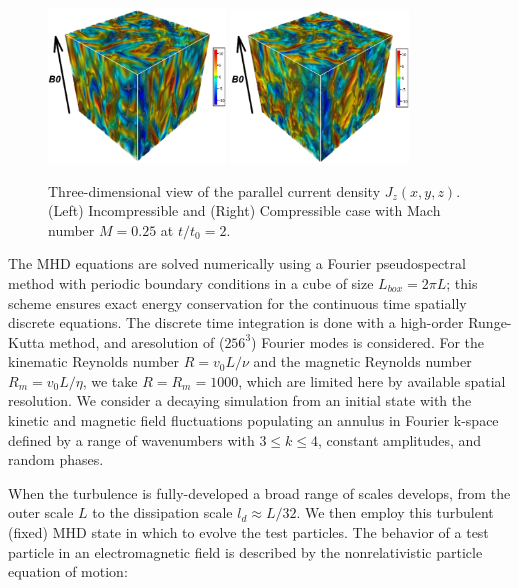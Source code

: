 \documentclass[%
aip,pop,amsmath,amssymb,
 reprint,%
]{revtex4-1}
\begin{document}
\begin{figure}[<t>]
\begin{center}
{\includegraphics[width = 0.42\textwidth]{./Figures/Fig1_a}}
{\includegraphics[width = 0.42\textwidth]{./Figures/Fig1_b}}
\caption{Three-dimensional view of the parallel current density $J_z(x,y,z)$. (Left) 
Incompressible and (Right) Compressible case with Mach number $M=0.25$ at $t/t_0 =2$.}
\end{center}
\end{figure}

The MHD equations are solved numerically using 
a Fourier pseudospectral method with periodic 
boundary conditions in a cube of size  $L_{box}=2\pi L$; 
this scheme ensures exact energy conservation for the continuous time spatially discrete
equations\cite{ghost}. The discrete time integration is done with a high-order Runge-Kutta
method, and aresolution of ($256^3$) Fourier modes is considered. For the kinematic Reynolds
number $R=v_0L/\nu$ and the magnetic Reynolds number $R_m=v_0L/\eta$, 
we take $R=R_m= 1000$, which are limited here by available
spatial resolution. We consider a decaying simulation from an 
initial state with the kinetic 
and magnetic field fluctuations populating an annulus in Fourier k-space 
defined by a range of wavenumbers with
$ 3\leq k \leq4$, constant amplitudes, and random phases.

When the turbulence is fully-developed a broad range of 
scales develops, from the outer scale $L$ to 
the dissipation scale $l_d\approx L/32$. We then employ this
turbulent (fixed) MHD state in which to evolve the test
particles. The behavior of a test particle in an electromagnetic field 
is described by the nonrelativistic particle equation of motion:
\end{document}
